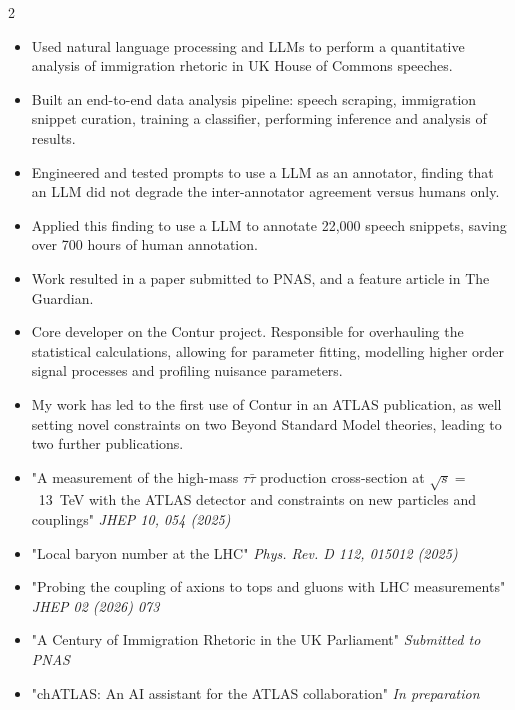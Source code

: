 \documentclass[10pt,a4paper,ragged2e,withhyper,normalphoto]{config/altacv}
\begin{document}
\begin{paracol}{2}
\begin{itemize}
\item Used natural language processing and LLMs to perform a quantitative analysis of immigration rhetoric in UK House of Commons speeches.
\item Built an end-to-end data analysis pipeline: speech scraping, immigration snippet curation, training a classifier, performing inference and analysis of results.
\item Engineered and tested prompts to use a LLM as an annotator, finding that an LLM did not degrade the inter-annotator agreement versus humans only. 
\item Applied this finding to use a LLM to annotate 22,000 speech snippets, saving over 700 hours of human annotation.
\item Work resulted in a paper submitted to PNAS, and a feature article in The Guardian.
\end{itemize}

\begin{itemize}
\item Core developer on the Contur project. Responsible for overhauling the statistical calculations, allowing for parameter fitting, modelling higher order signal processes and profiling nuisance parameters.
\item My work has led to the first use of Contur in an ATLAS publication, as well setting novel constraints on two Beyond Standard Model theories, leading to two further publications.
\end{itemize}

\switchcolumn %


\begin{itemize}
  \item "A measurement of the high-mass $\tau\bar\tau$ production cross-section at $\sqrt{s}=$~13~TeV with the ATLAS detector and constraints on new particles and couplings" \textit{JHEP 10, 054 (2025)}
  \item "Local baryon number at the LHC" \textit{Phys. Rev. D 112, 015012 (2025)}
  \item "Probing the coupling of axions to tops and gluons with LHC measurements" \textit{JHEP 02 (2026) 073}
  \item "A Century of Immigration Rhetoric in the UK Parliament" \textit{Submitted to PNAS}
  \item "chATLAS: An AI assistant for the ATLAS collaboration" \textit{In preparation}
\end{itemize}


\end{paracol}
\end{document}
